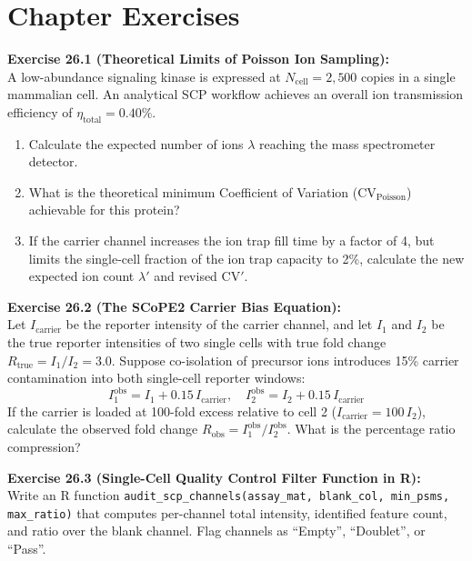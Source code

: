 \documentclass[11pt,twoside,openright]{book}
\begin{document}
\section{Chapter Exercises}

\noindent
\textbf{Exercise 26.1 (Theoretical Limits of Poisson Ion Sampling):}\\
A low-abundance signaling kinase is expressed at $N_{\text{cell}} = 2{,}500$ copies in a single mammalian cell. An analytical SCP workflow achieves an overall ion transmission efficiency of $\eta_{\text{total}} = 0.40\%$.
\begin{enumerate}
    \item Calculate the expected number of ions $\lambda$ reaching the mass spectrometer detector.
    \item What is the theoretical minimum Coefficient of Variation ($\text{CV}_{\text{Poisson}}$) achievable for this protein?
    \item If the carrier channel increases the ion trap fill time by a factor of 4, but limits the single-cell fraction of the ion trap capacity to 2\%, calculate the new expected ion count $\lambda'$ and revised $\text{CV}'$.
\end{enumerate}

\vspace{0.8em}
\noindent
\textbf{Exercise 26.2 (The SCoPE2 Carrier Bias Equation):}\\
Let $I_{\text{carrier}}$ be the reporter intensity of the carrier channel, and let $I_1$ and $I_2$ be the true reporter intensities of two single cells with true fold change $R_{\text{true}} = I_1 / I_2 = 3.0$. Suppose co-isolation of precursor ions introduces 15\% carrier contamination into both single-cell reporter windows:
\begin{equation}
I_1^{\text{obs}} = I_1 + 0.15 \, I_{\text{carrier}}, \quad I_2^{\text{obs}} = I_2 + 0.15 \, I_{\text{carrier}}
\end{equation}
If the carrier is loaded at 100-fold excess relative to cell 2 ($I_{\text{carrier}} = 100 \, I_2$), calculate the observed fold change $R_{\text{obs}} = I_1^{\text{obs}} / I_2^{\text{obs}}$. What is the percentage ratio compression?

\vspace{0.8em}
\noindent
\textbf{Exercise 26.3 (Single-Cell Quality Control Filter Function in R):}\\
Write an R function \texttt{audit\_scp\_channels(assay\_mat, blank\_col, min\_psms, max\_ratio)} that computes per-channel total intensity, identified feature count, and ratio over the blank channel. Flag channels as ``Empty'', ``Doublet'', or ``Pass''.
\end{document}
